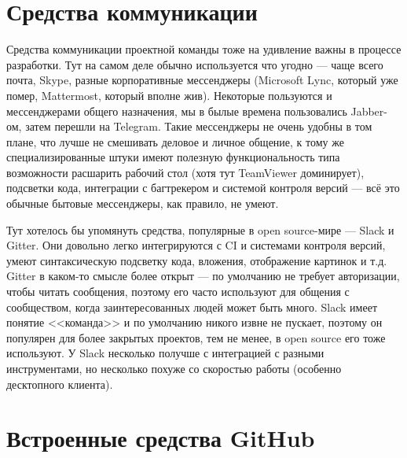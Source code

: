 \documentclass[a5paper]{article}
\begin{document}
\section{Средства коммуникации}

Средства коммуникации проектной команды тоже на удивление важны в процессе разработки. Тут на самом деле обычно используется что угодно --- чаще всего почта, Skype, разные корпоративные мессенджеры (Microsoft Lync, который уже помер, Mattermost, который вполне жив). Некоторые пользуются и мессенджерами общего назначения, мы в былые времена пользовались Jabber-ом, затем перешли на Telegram. Такие мессенджеры не очень удобны в том плане, что лучше не смешивать деловое и личное общение, к тому же специализированные штуки имеют полезную функциональность типа возможности расшарить рабочий стол (хотя тут TeamViewer доминирует), подсветки кода, интеграции с багтрекером и системой контроля версий --- всё это обычные бытовые мессенджеры, как правило, не умеют.

Тут хотелось бы упомянуть средства, популярные в open source-мире --- Slack и Gitter. Они довольно легко интегрируются с CI и системами контроля версий, умеют синтаксическую подсветку кода, вложения, отображение картинок и т.д. Gitter в каком-то смысле более открыт --- по умолчанию не требует авторизации, чтобы читать сообщения, поэтому его часто используют для общения с сообществом, когда заинтересованных людей может быть много. Slack имеет понятие <<команда>> и по умолчанию никого извне не пускает, поэтому он популярен для более закрытых проектов, тем не менее, в open source его тоже используют. У Slack несколько получше с интеграцией с разными инструментами, но несколько похуже со скоростью работы (особенно десктопного клиента).

\section{Встроенные средства GitHub}
\end{document}
